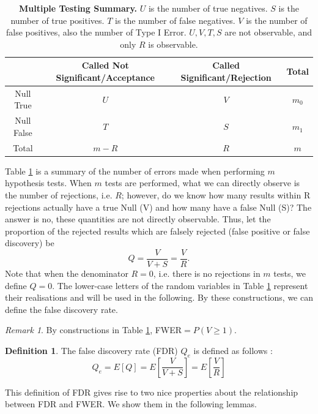 \documentclass[12pt]{article}
\theoremstyle{plain}
\theoremstyle{definition}
\newtheorem{definition}{Definition}
\theoremstyle{remark}
\newtheorem*{remark}{Remark}
\begin{document}
\begin{table}[h]
    \centering
    \begin{tabular}{|c|c|c|c|}
    \hline
    & Called Not Significant/Acceptance & Called Significant/Rejection & Total \\
    \hline
    Null True & $U$ & $V$ & $m_0$\\
    \hline
    Null False & $T$ & $S$ & $m_1$\\
    \hline
    Total & $m-R$ & $R$ & $m$\\
    \hline
    \end{tabular}
    \caption{\textbf{Multiple Testing Summary.} $U$ is the number of true negatives. $S$ is the number of true positives. $T$ is the number of false negatives. $V$ is the number of false positives, also the number of Type I Error. $U,V,T,S$ are not observable, and only $R$ is observable.\cite{5.3}\cite{5.7}}
    \label{table 3}
\end{table}

Table \ref{table 3} is a summary of the number of errors made when performing $m$ hypothesis tests. When $m$ tests are performed, what we can directly observe is the number of rejections, i.e. $R$; however, do we know how many results within R rejections actually have a true Null (V) and how many have a false Null (S)? The answer is no, these quantities are not directly observable.\cite{5.3}\cite{5.7} Thus, let the proportion of the rejected results which are falsely rejected (false positive or false discovery) be $$Q=\frac{V}{V+S}=\frac{V}{R}.$$  Note that when the denominator $R=0$, i.e. there is no rejections in $m$ tests, we define $Q=0$. The lower-case letters of the random variables in Table \ref{table 3} represent their realisations and will be used in the following. By these constructions, we can define the false discovery rate.

\begin{remark}
By constructions in Table \ref{table 3}, FWER$=P(V\ge1)$.
\end{remark}

\begin{definition}
The false discovery rate (FDR) $Q_e$ is defined as follows \cite{5.7}:\[
Q_e=E[Q]=E\left[\frac{V}{V+S}\right]=E\left[\frac{V}{R}\right]
\]
\end{definition}

This definition of FDR gives rise to two nice properties about the relationship between FDR and FWER. We show them in the following lemmas.
\end{document}

